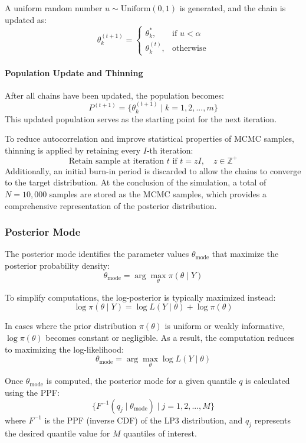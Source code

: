 A uniform random number $u \sim \text{Uniform}(0, 1)$ is generated, and the chain is updated as:
$$\theta_k^{(t+1)} = 
\begin{cases} 
\theta_k^*, & \text{if } u < \alpha\\ 
\theta_k^{(t)}, & \text{otherwise} 
\end{cases}$$

\paragraph{Population Update and Thinning}
After all chains have been updated, the population becomes:
$$P^{(t+1)} = \{ \theta_k^{(t+1)}\mid k =1,2, ...,m\}$$
This updated population serves as the starting point for the next iteration. 

To reduce autocorrelation and improve statistical properties of MCMC samples, thinning is applied by retaining every $I$-th iteration:
$$\text{Retain sample at iteration } t \text{ if }t = zI, \quad z \in \mathbb{Z}^+$$
Additionally, an initial burn-in period is discarded to allow the chains to converge to the target distribution. At the conclusion of the simulation, a total of $N = 10,000$ samples are stored as the MCMC samples, which provides a comprehensive representation of the posterior distribution.

\subsubsection{Posterior Mode}
The posterior mode identifies the parameter values $\theta_{\text{mode}}$ that maximize the posterior probability density:
$$\theta_{\text{mode}} = \arg\max_{\theta} \pi(\theta \mid Y)$$

To simplify computations, the log-posterior is typically maximized instead:
$$\log \pi(\theta \mid Y) = \log L(Y \mid \theta) + \log \pi(\theta)$$

In cases where the prior distribution $\pi(\theta )$ is uniform or weakly informative, $\log \pi(\theta)$ becomes constant or negligible. As a result, the computation reduces to maximizing the log-likelihood:
$$\theta_{\text{mode}} = \arg\max_{\theta} \log L(Y\mid \theta)$$

Once $\theta_{\text{mode}}$ is computed, the posterior mode for a given quantile $q$ is calculated using the PPF:
$$\big\{F^{-1} (q_j \mid \theta_{\text{mode}}) \mid j = 1, 2, ..., M\big\}$$
where $F^{-1}$ is the PPF (inverse CDF) of the LP3 distribution, and $q_j$ represents the desired quantile value for $M$ quantiles of interest.

